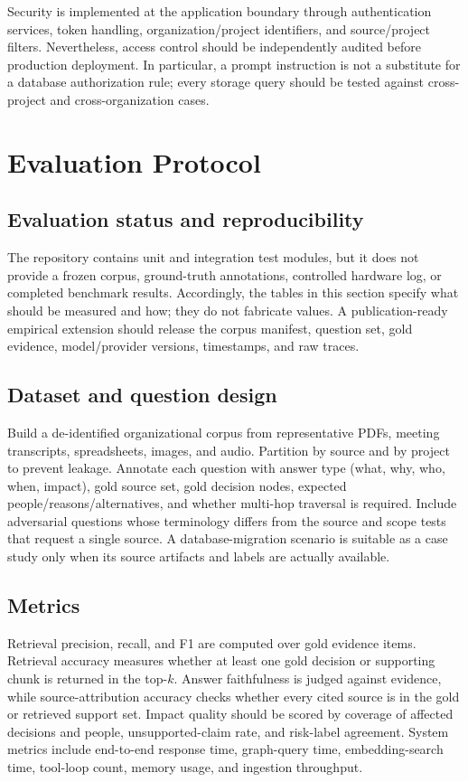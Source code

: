 \documentclass[conference]{IEEEtran}
\begin{document}
Security is implemented at the application boundary through authentication services, token handling, organization/project identifiers, and source/project filters. Nevertheless, access control should be independently audited before production deployment. In particular, a prompt instruction is not a substitute for a database authorization rule; every storage query should be tested against cross-project and cross-organization cases.

\section{Evaluation Protocol}
\subsection{Evaluation status and reproducibility}
The repository contains unit and integration test modules, but it does not provide a frozen corpus, ground-truth annotations, controlled hardware log, or completed benchmark results. Accordingly, the tables in this section specify what should be measured and how; they do not fabricate values. A publication-ready empirical extension should release the corpus manifest, question set, gold evidence, model/provider versions, timestamps, and raw traces.

\subsection{Dataset and question design}
Build a de-identified organizational corpus from representative PDFs, meeting transcripts, spreadsheets, images, and audio. Partition by source and by project to prevent leakage. Annotate each question with answer type (what, why, who, when, impact), gold source set, gold decision nodes, expected people/reasons/alternatives, and whether multi-hop traversal is required. Include adversarial questions whose terminology differs from the source and scope tests that request a single source. A database-migration scenario is suitable as a case study only when its source artifacts and labels are actually available.

\subsection{Metrics}
Retrieval precision, recall, and F1 are computed over gold evidence items. Retrieval accuracy measures whether at least one gold decision or supporting chunk is returned in the top-$k$. Answer faithfulness is judged against evidence, while source-attribution accuracy checks whether every cited source is in the gold or retrieved support set. Impact quality should be scored by coverage of affected decisions and people, unsupported-claim rate, and risk-label agreement. System metrics include end-to-end response time, graph-query time, embedding-search time, tool-loop count, memory usage, and ingestion throughput.
\end{document}
